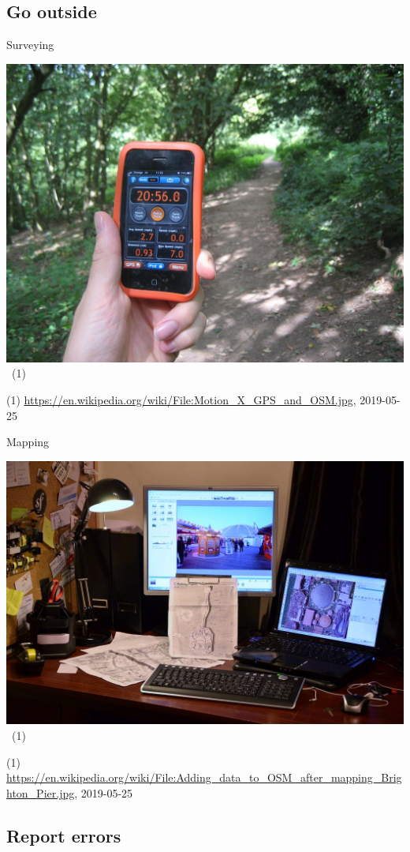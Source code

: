 \documentclass{beamer}
\begin{document}
	\subsection{Go outside}
	
	\begin{frame}{Surveying}
		\begin{center}
			\includegraphics[width=0.7\linewidth,height=0.7\textheight,keepaspectratio]{images/surveying}~\tiny{(1)}
		\end{center}
		{\tiny (1) \url{https://en.wikipedia.org/wiki/File:Motion\_X\_GPS\_and\_OSM.jpg}, 2019-05-25}
	\end{frame}

	\begin{frame}{Mapping}
		\begin{center}
			\includegraphics[width=0.7\linewidth,height=0.7\textheight,keepaspectratio]{images/mapping_outdoor}~\tiny{(1)}
		\end{center}
		{\tiny (1) \url{https://en.wikipedia.org/wiki/File:Adding\_data\_to\_OSM\_after\_mapping\_Brighton\_Pier.jpg}, 2019-05-25}
	\end{frame}
	
	\subsection{Report errors}
	
\end{document}
